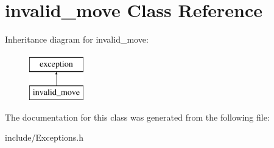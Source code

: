 \hypertarget{classinvalid__move}{}\section{invalid\+\_\+move Class Reference}
\label{classinvalid__move}
Inheritance diagram for invalid\+\_\+move\+:\begin{figure}[H]
\begin{center}
\leavevmode
\includegraphics[height=2.000000cm]{classinvalid__move}
\end{center}
\end{figure}


The documentation for this class was generated from the following file\+:\begin{DoxyCompactItemize}
\item 
include/Exceptions.\+h\end{DoxyCompactItemize}
